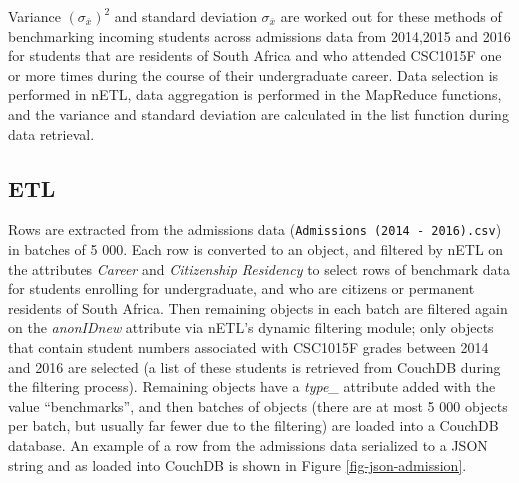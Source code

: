 Variance $(\sigma_{\overline{x}})^{2}$ and standard deviation $\sigma_{\overline{x}}$ are worked out for these methods of benchmarking incoming students across admissions data from 2014,2015 and 2016 for students that are residents of South Africa and who attended CSC1015F one or more times during the course of their undergraduate career. Data selection is performed in nETL, data aggregation is performed in the MapReduce functions, and the variance and standard deviation are calculated in the list function during data retrieval.

\subsection{ETL}
Rows are extracted from the admissions data (\texttt{Admissions (2014 - 2016).csv}) in batches of 5 000. Each row is converted to an object, and filtered by nETL on the attributes \textit{Career} and \textit{Citizenship Residency} to select rows of benchmark data for students enrolling for undergraduate, and who are citizens or permanent residents of South Africa. Then remaining objects in each batch are filtered again on the \textit{anonIDnew} attribute via nETL's dynamic filtering module; only objects that contain student numbers associated with CSC1015F grades between 2014 and 2016 are selected (a list of these students is retrieved from CouchDB during the filtering process). Remaining objects have a \textit{type\_} attribute added with the value ``benchmarks'', and then batches of objects (there are at most 5 000 objects per batch, but usually far fewer due to the filtering) are loaded into a CouchDB database. An example of a row from the admissions data serialized to a JSON string and as loaded into CouchDB is shown in Figure \ref{fig-json-admission}.



